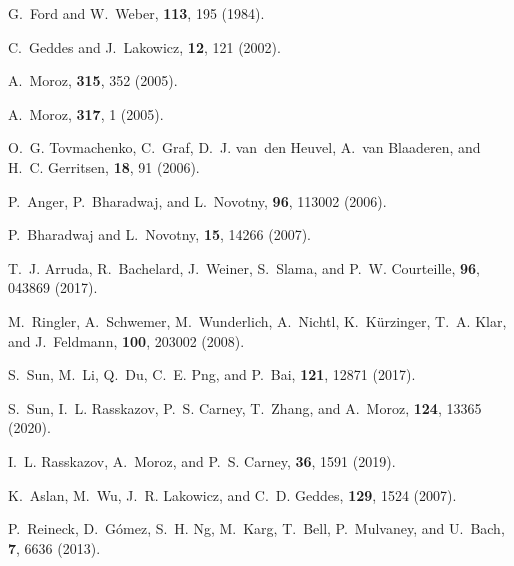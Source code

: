 \documentclass[9pt,twocolumn,twoside]{osajnl}
\begin{document}
\begin{thebibliography}{10}
\newcommand{\enquote}[1]{``#1''}

G.~Ford and W.~Weber, {\protect{}} \textbf{113},
  195 (1984).

C.~Geddes and J.~Lakowicz, {\protect{}}
  \textbf{12}, 121 (2002).

A.~Moroz, {\protect{}} \textbf{315}, 352 (2005).

A.~Moroz, {\protect{}} \textbf{317}, 1 (2005).

O.~G. Tovmachenko, C.~Graf, D.~J. van~den Heuvel, A.~van Blaaderen, and H.~C.
  Gerritsen, {\protect{}} \textbf{18}, 91
  (2006).

P.~Anger, P.~Bharadwaj, and L.~Novotny, {\protect{}} \textbf{96}, 113002 (2006).

P.~Bharadwaj and L.~Novotny, {\protect{}}
  \textbf{15}, 14266 (2007).

T.~J. Arruda, R.~Bachelard, J.~Weiner, S.~Slama, and P.~W. Courteille,
  {\protect{}} \textbf{96}, 043869 (2017).

M.~Ringler, A.~Schwemer, M.~Wunderlich, A.~Nichtl, K.~K{\"{u}}rzinger, T.~A.
  Klar, and J.~Feldmann, {\protect{}}
  \textbf{100}, 203002 (2008).

S.~Sun, M.~Li, Q.~Du, C.~E. Png, and P.~Bai, {\protect{}} \textbf{121}, 12871 (2017).

S.~Sun, I.~L. Rasskazov, P.~S. Carney, T.~Zhang, and A.~Moroz,
  {\protect{}} \textbf{124}, 13365
  (2020).

I.~L. Rasskazov, A.~Moroz, and P.~S. Carney, {\protect{}} \textbf{36}, 1591 (2019).

K.~Aslan, M.~Wu, J.~R. Lakowicz, and C.~D. Geddes,
  {\protect{}}
  \textbf{129}, 1524 (2007).

P.~Reineck, D.~G{\'{o}}mez, S.~H. Ng, M.~Karg, T.~Bell, P.~Mulvaney, and
  U.~Bach, {\protect{}} \textbf{7}, 6636 (2013).


\end{thebibliography}
\end{document}
